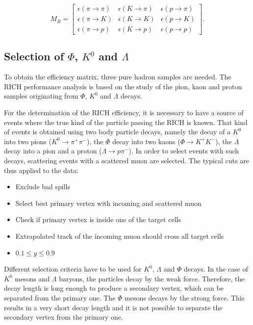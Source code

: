 \begin{equation}
  M_R
  =
  \begin{bmatrix}
  \epsilon(\pi \rightarrow \pi) & \epsilon(K \rightarrow \pi) & \epsilon(p \rightarrow \pi)\\
  \epsilon(\pi \rightarrow K) & \epsilon(K \rightarrow K) & \epsilon(p \rightarrow K) \\
  \epsilon(\pi \rightarrow p) & \epsilon(K \rightarrow p) & \epsilon(p \rightarrow p)
  \end{bmatrix}.
\end{equation}

\subsection{Selection of $\Phi$, $K^0$ and $\Lambda$}

To obtain the efficiency matrix, three pure hadron samples are needed. The RICH performance analysis is based on the study of the pion, kaon and proton samples originating from $\Phi$, $K^0$ and $\Lambda$ decays.

For the determination of the RICH efficiency, it is necessary to have a source of events where the true kind of the particle passing the RICH is known. That kind of events is obtained using two body particle decays, namely the decay of a $K^0$ into two pions ($K^0 \rightarrow \pi^+\pi^-$), the $\Phi$ decay into two kaons ($\Phi \rightarrow K^+K^-$), the $\Lambda$ decay into a pion and a proton ($\Lambda \rightarrow p\pi^-$). In order to select events with such decays, scattering events with a scattered muon are selected. The typical cuts are thus applied to the data:
\begin{itemize}
  \item Exclude bad spills
  \item Select best primary vertex with incoming and scattered muon
  \item Check if primary vertex is inside one of the target cells
  \item Extrapolated track of the incoming muon should cross all target cells
  \item $0.1 \le y \le 0.9$
\end{itemize}

Different selection criteria have to be used for $K^0$, $\Lambda$ and $\Phi$ decays. In the case of $K^0$ mesons and $\Lambda$ baryons, the particles decay by the weak force. Therefore, the decay length is long enough to produce a secondary vertex, which can be separated from the primary one. The $\Phi$ mesons decays by the strong force. This results in a very short decay length and it is not possible to separate the secondary vertex from the primary one.

